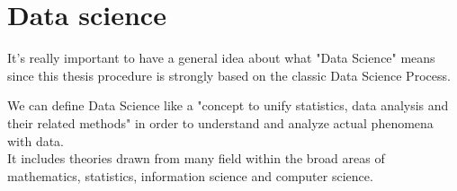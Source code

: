 
\section{Data science}
It's really important to have a general idea about what "Data Science" means since this thesis procedure is strongly based on the classic Data Science Process.

We can define Data Science like a "concept to unify statistics, data analysis and their related methods" in order to understand and analyze actual phenomena with data.\\
It includes theories drawn from many field within the broad areas of mathematics, statistics, information science and computer science.

